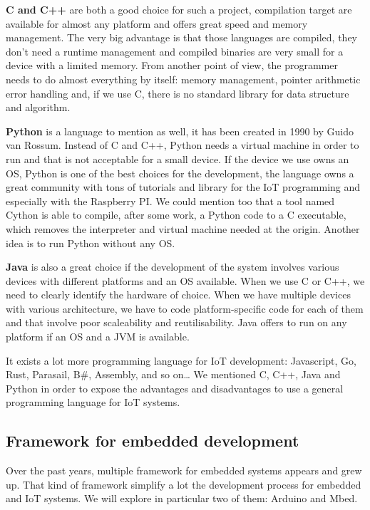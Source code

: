 \textbf{C and C++} are both a good choice for such a project, compilation target are
available for almost any platform and offers great speed and memory management.
The very big advantage is that those languages are compiled, they don’t need a
runtime management and compiled binaries are very small for a device with a
limited memory. From another point of view, the programmer needs to do almost
everything by itself: memory management, pointer arithmetic error handling
and, if we use C, there is no standard library for data structure and algorithm.

\textbf{Python} is a language to mention as well, it has been created in 1990
by Guido van Rossum. \cite{Rossum:1995:PRM:869369} Instead of C and C++, Python
needs a virtual machine in order to run and that is not acceptable for a small
device. If the device we use owns an \gls{OS}, Python is one of the best choices
for the development, the language owns a great community with tons of tutorials
and library for the \gls{IoT} programming and especially with the Raspberry PI. We
could mention too that a tool named Cython\cite{behnel2010cython} is able to
compile, after some work, a Python code to a C executable, which removes the
interpreter and virtual machine needed at the origin. Another idea is to run
Python without any \gls{OS}\cite{jakeedge2015}.

\textbf{Java} is also a great choice if the development of the system involves
various devices with different platforms and an \gls{OS} available. When we use C
or C++, we need to clearly identify the hardware of choice. When we have
multiple devices with various architecture, we have to code platform-specific
code for each of them and that involve poor scaleability and reutilisability.
Java offers to run on any platform if an \gls{OS} and a \gls{JVM} is available.

It exists a lot more programming language for \gls{IoT} development: Javascript,
Go, Rust, Parasail, B\#, Assembly, and so on… We mentioned C, C++, Java and
Python in order to expose the advantages and disadvantages to use a general
programming language for \gls{IoT} systems.

\subsection{Framework for embedded development}
\label{sec:framework_for_embeded_dev}

Over the past years, multiple framework for embedded systems appears and grew up.
That kind of framework simplify a lot the development process for embedded and
\gls{IoT} systems. We will explore in particular two of them: Arduino and
Mbed.


